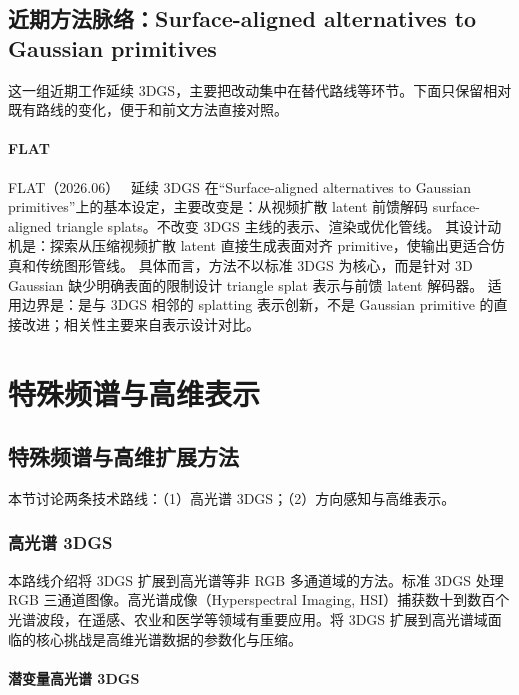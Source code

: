 

\subsection{近期方法脉络：Surface-aligned alternatives to Gaussian primitives}

这一组近期工作延续 3DGS，主要把改动集中在替代路线等环节。下面只保留相对既有路线的变化，便于和前文方法直接对照。

\paragraph{FLAT}
FLAT（2026.06）~\cite{2606_24876} 延续 3DGS 在“Surface-aligned alternatives to Gaussian primitives”上的基本设定，主要改变是：从视频扩散 latent 前馈解码 surface-aligned triangle splats。不改变 3DGS 主线的表示、渲染或优化管线。
其设计动机是：探索从压缩视频扩散 latent 直接生成表面对齐 primitive，使输出更适合仿真和传统图形管线。
具体而言，方法不以标准 3DGS 为核心，而是针对 3D Gaussian 缺少明确表面的限制设计 triangle splat 表示与前馈 latent 解码器。
适用边界是：是与 3DGS 相邻的 splatting 表示创新，不是 Gaussian primitive 的直接改进；相关性主要来自表示设计对比。
\section{特殊频谱与高维表示}
\label{sec:03_5}

\subsection{特殊频谱与高维扩展方法}

本节讨论两条技术路线：（1）高光谱 3DGS；（2）方向感知与高维表示。

\subsubsection{高光谱 3DGS}

本路线介绍将 3DGS 扩展到高光谱等非 RGB 多通道域的方法。标准 3DGS 处理 RGB 三通道图像。高光谱成像（Hyperspectral Imaging, HSI）捕获数十到数百个光谱波段，在遥感、农业和医学等领域有重要应用。将 3DGS 扩展到高光谱域面临的核心挑战是高维光谱数据的参数化与压缩。

\paragraph{潜变量高光谱 3DGS}

